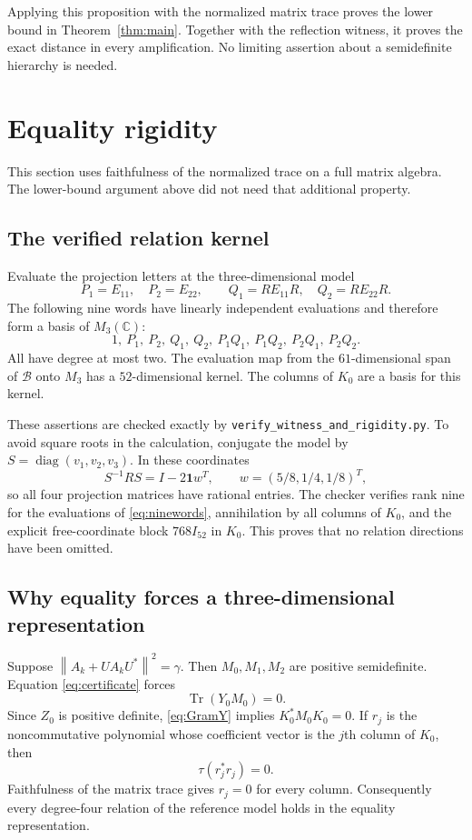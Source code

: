 \documentclass[11pt]{article}
\theoremstyle{definition}\newtheorem{definition}[theorem]{Definition}
\theoremstyle{remark}\newtheorem{remark}[theorem]{Remark}
\newcommand{\C}{\mathbb C}
\newcommand{\Tr}{\operatorname{Tr}}
\newcommand{\diag}{\operatorname{diag}}
\newcommand{\norm}[1]{\left\lVert#1\right\rVert}
\newcommand{\Bwords}{\mathcal B}
\begin{document}
Applying this proposition with the normalized matrix trace proves the lower bound in Theorem~\ref{thm:main}. Together with the reflection witness, it proves the exact distance in every amplification. No limiting assertion about a semidefinite hierarchy is needed.

\section{Equality rigidity}
This section uses faithfulness of the normalized trace on a full matrix algebra. The lower-bound argument above did not need that additional property.

\subsection{The verified relation kernel}
Evaluate the projection letters at the three-dimensional model
\[
 P_1=E_{11},\quad P_2=E_{22},\qquad Q_1=RE_{11}R,\quad Q_2=RE_{22}R.
\]
The following nine words have linearly independent evaluations and therefore form a basis of $M_3(\C)$:
\begin{equation}\label{eq:ninewords}
 1,\ P_1,\ P_2,\ Q_1,\ Q_2,\ P_1Q_1,\ P_1Q_2,\ P_2Q_1,\ P_2Q_2.
\end{equation}
All have degree at most two. The evaluation map from the $61$-dimensional span of $\Bwords$ onto $M_3$ has a $52$-dimensional kernel. The columns of $K_0$ are a basis for this kernel.

These assertions are checked exactly by \texttt{verify\_witness\_and\_rigidity.py}. To avoid square roots in the calculation, conjugate the model by $S=\diag(v_1,v_2,v_3)$. In these coordinates
\[
 S^{-1}RS=I-2\mathbf1w^T,\qquad w=(5/8,1/4,1/8)^T,
\]
so all four projection matrices have rational entries. The checker verifies rank nine for the evaluations of \eqref{eq:ninewords}, annihilation by all columns of $K_0$, and the explicit free-coordinate block $768I_{52}$ in $K_0$. This proves that no relation directions have been omitted.

\subsection{Why equality forces a three-dimensional representation}
Suppose $\norm{A_k+UA_kU^*}^2=\gamma$. Then $M_0,M_1,M_2$ are positive semidefinite. Equation \eqref{eq:certificate} forces
\[
 \Tr(Y_0M_0)=0.
\]
Since $Z_0$ is positive definite, \eqref{eq:GramY} implies $K_0^*M_0K_0=0$. If $r_j$ is the noncommutative polynomial whose coefficient vector is the $j$th column of $K_0$, then
\[
 \tau(r_j^*r_j)=0.
\]
Faithfulness of the matrix trace gives $r_j=0$ for every column. Consequently every degree-four relation of the reference model holds in the equality representation.
\end{document}
